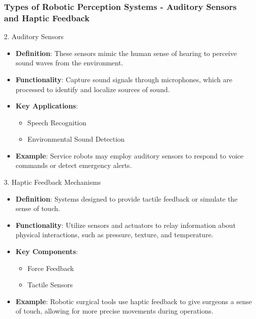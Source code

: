 \documentclass{beamer}
\begin{document}
\begin{frame}[fragile]
    \frametitle{Types of Robotic Perception Systems - Auditory Sensors and Haptic Feedback}
    \begin{block}{2. Auditory Sensors}
        \begin{itemize}
            \item \textbf{Definition}: These sensors mimic the human sense of hearing to perceive sound waves from the environment.
            \item \textbf{Functionality}: Capture sound signals through microphones, which are processed to identify and localize sources of sound.
            \item \textbf{Key Applications}:
                \begin{itemize}
                    \item Speech Recognition
                    \item Environmental Sound Detection
                \end{itemize}
            \item \textbf{Example}: Service robots may employ auditory sensors to respond to voice commands or detect emergency alerts.
        \end{itemize}
    \end{block}
    
    \begin{block}{3. Haptic Feedback Mechanisms}
        \begin{itemize}
            \item \textbf{Definition}: Systems designed to provide tactile feedback or simulate the sense of touch.
            \item \textbf{Functionality}: Utilize sensors and actuators to relay information about physical interactions, such as pressure, texture, and temperature.
            \item \textbf{Key Components}:
                \begin{itemize}
                    \item Force Feedback
                    \item Tactile Sensors
                \end{itemize}
            \item \textbf{Example}: Robotic surgical tools use haptic feedback to give surgeons a sense of touch, allowing for more precise movements during operations.
        \end{itemize}
    \end{block}
\end{frame}
\end{document}
